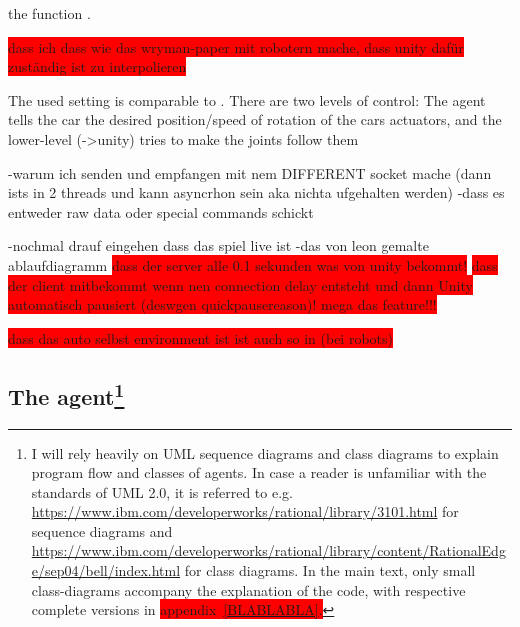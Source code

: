 			
			

the function .

\colorbox{red}{dass ich dass wie das wryman-paper mit robotern mache, dass unity dafür zuständig ist zu interpolieren}

The used setting is comparable to \cite{wawrzynski_control_2015}. There are two levels of control: The agent tells the car the desired position/speed of rotation of the cars actuators, and the lower-level (->unity) tries to make the joints follow them


-warum ich senden und empfangen mit nem DIFFERENT socket mache (dann ists in 2 threads und kann asyncrhon sein aka nichta ufgehalten werden)
-dass es entweder raw data oder special commands schickt

-nochmal drauf eingehen dass das spiel live ist
-das von leon gemalte ablaufdiagramm
\colorbox{red}{dass der server alle 0.1 sekunden was von unity bekommt!}
\colorbox{red}{dass der client mitbekommt wenn nen connection delay entsteht und dann 
	Unity automatisch pausiert (deswgen quickpausereason)! mega das feature!!!}

\colorbox{red}{dass das auto selbst environment ist ist auch so in \cite{wawrzynski_control_2015} (bei robots)}

\subsection{The agent\footnote{I will rely heavily on UML sequence diagrams and class diagrams to explain program flow and classes of agents. In case a reader is unfamiliar with the standards of UML 2.0, it is referred to e.g. \url{https://www.ibm.com/developerworks/rational/library/3101.html} for sequence diagrams and \url{https://www.ibm.com/developerworks/rational/library/content/RationalEdge/sep04/bell/index.html} for class diagrams. In the main text, only small class-diagrams accompany the explanation of the code, with respective complete versions in  \colorbox{red}{appendix~\ref{BLABLABLA}.}}}

